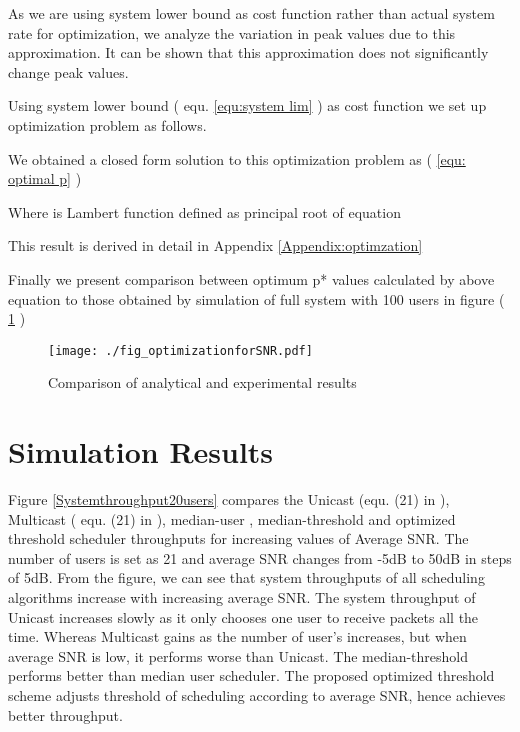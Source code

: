 \documentclass[conference]{IEEEtran}
\begin{document}
As we are using system lower bound as cost function rather than actual system rate for optimization, we  analyze the variation in peak values due to this approximation. It can be shown that this approximation does not significantly change peak values. 




Using system lower bound ( equ. \ref{equ:system lim} ) as  cost function we set up optimization problem as follows.   
 
We obtained a closed form solution to this optimization problem as  ( \ref{equ: optimal p} )

  
Where is Lambert function \cite{Lambert_W} defined as principal root of equation   

This result is derived in detail in Appendix \ref{Appendix:optimzation}

Finally we present comparison between optimum p* values calculated by above equation to those obtained by simulation of full system with 100 users in figure ( \ref{Fig: Optimzation_analytical} )



\begin{figure}[h!]
\begin{center}
    \texttt{[image: ./fig\_optimizationforSNR.pdf]}
  \end{center}
  \vspace{-130pt}
 \caption{Comparison of analytical and experimental results}\label{Fig: Optimzation_analytical}
\end{figure}



















\section{Simulation Results}

Figure \ref{Systemthroughput20users} compares the Unicast (equ. (21) in \cite{Multi_vs_Uni}), Multicast  ( equ. (21) in  \cite{Multi_vs_Uni} ), median-user \cite{Praveen_Kumar} , median-threshold and optimized threshold scheduler throughputs for increasing values of Average SNR. The number of users is set as 21 and average SNR changes from -5dB to 50dB in steps of 5dB. From the figure, we can see that system throughputs of all scheduling algorithms increase with increasing average SNR. The system throughput of Unicast increases slowly as it only chooses one user to receive packets all the time. Whereas Multicast gains as the number of user’s increases, but when average SNR is low, it performs worse than Unicast. The median-threshold performs better than median user scheduler. The proposed optimized threshold scheme adjusts threshold of scheduling according to average SNR, hence achieves better throughput.
 
\end{document}
